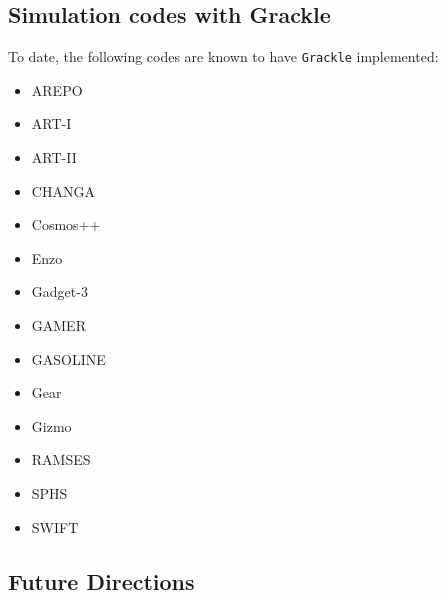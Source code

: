 \subsection{Simulation codes with Grackle}
To date, the following codes are known to have \texttt{Grackle}
implemented:
\begin{itemize}

\item AREPO \citep{2010MNRAS.401..791S}

\item ART-I \citep{1999PhDT........25K, 2002ApJ...571..563K}

\item ART-II \citep{2008ApJ...672...19R}

\item CHANGA \citep{2004NewA....9..137W, 2006MNRAS.373.1074S}

\item Cosmos++ \citep{2003ApJS..147..177A, 2005ApJ...635..723A}

\item Enzo \citep{2014ApJS..211...19B}

\item Gadget-3 \citep{2005MNRAS.364.1105S}

\item GAMER \citep{2010ApJS..186..457S}

\item GASOLINE \citep{2004NewA....9..137W}

\item Gear \citep{2012A&A...538A..82R, 2012ASPC..453..141R}

\item Gizmo \citep{2015MNRAS.450...53H}

\item RAMSES \citep{2002A&A...385..337T}

\item SPHS \citep{2012MNRAS.422.3037R}

\item SWIFT \citep{2013arXiv1309.3783G, 2016arXiv160602738S}
\end{itemize}

\subsection{Future Directions} \label{Future_Directions}

